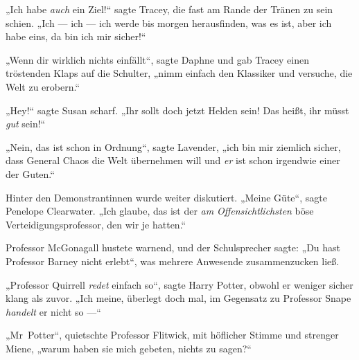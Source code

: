 „Ich habe \emph{auch} ein Ziel!“ sagte Tracey, die fast am Rande der Tränen zu sein schien.
„Ich — ich — ich werde bis morgen herausfinden, was es ist, aber ich habe eins, da bin ich mir sicher!“

„Wenn dir wirklich nichts einfällt“, sagte Daphne und gab Tracey einen tröstenden Klaps auf die Schulter, „nimm einfach den Klassiker und versuche, die Welt zu erobern.“

„Hey!“ sagte Susan scharf.
„Ihr sollt doch jetzt Helden sein! Das heißt, ihr müsst \emph{gut} sein!“

„Nein, das ist schon in Ordnung“, sagte Lavender, „ich bin mir ziemlich sicher, dass General Chaos die Welt übernehmen will und \emph{er} ist schon irgendwie einer der Guten.“

Hinter den Demonstrantinnen wurde weiter diskutiert.
„Meine Güte“, sagte Penelope Clearwater.
„Ich glaube, das ist der \emph{am} \emph{Offensichtlichsten} böse Verteidigungsprofessor, den wir je hatten.“

Professor McGonagall hustete warnend, und der Schulsprecher sagte:
„Du hast Professor Barney nicht erlebt“, was mehrere Anwesende zusammenzucken ließ.

„Professor Quirrell \emph{redet} einfach so“, sagte Harry Potter, obwohl er weniger sicher klang als zuvor.
„Ich meine, überlegt doch mal, im Gegensatz zu Professor Snape \emph{handelt} er nicht so —“

„Mr~Potter“, quietschte Professor Flitwick, mit höflicher Stimme und strenger Miene, „warum haben sie mich gebeten, nichts zu sagen?“

